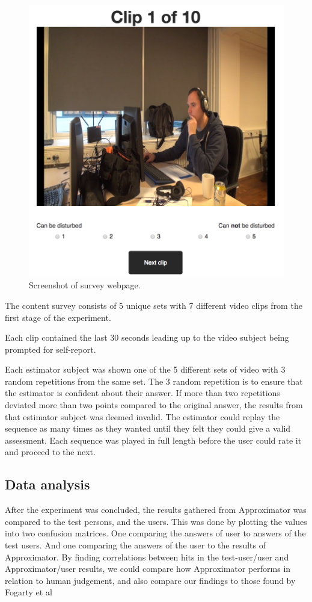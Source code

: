 \documentclass{sigchi}
\begin{document}
\begin{figure}
  \centering
  \includegraphics[width=\columnwidth]{figures/webpage_screenshot.png}
  \caption{Screenshot of survey webpage.}
  \label{fig:webpage}
\end{figure}

The content survey consists of 5 unique sets with 7 different video clips from the first stage of the experiment.

Each clip contained the last 30 seconds leading up to the video subject being prompted for self-report.

Each estimator subject was shown one of the 5 different sets of video with 3 random repetitions from the same set.
The 3 random repetition is to ensure that the estimator is confident about their answer.
If more than two repetitions deviated more than two points compared to the original answer, the results from that estimator subject was deemed invalid.
The estimator could replay the sequence as many times as they wanted until they felt they could give a valid assessment.
Each sequence was played in full length before the user could rate it and proceed to the next.

\subsection{Data analysis}
After the experiment was concluded, the results gathered from Approximator was compared to the test persons, and the users.
This was done by plotting the values into two confusion matrices.
One comparing the answers of user to answers of the test users.
And one comparing the answers of the user to the results of Approximator.
By finding correlations between hits in the test-user/user and Approximator/user results, we could compare how Approximator performs in relation to human judgement, and also compare our findings to those found by Fogarty et al \cite{fogarty2005predicting}
\end{document}
